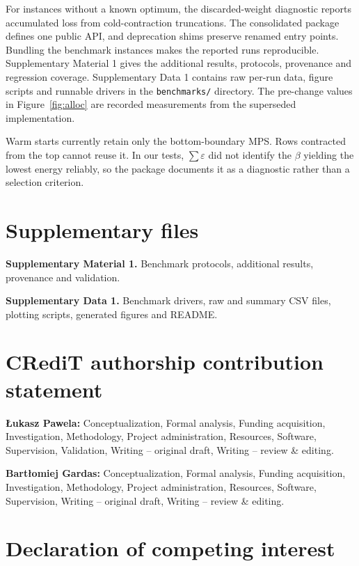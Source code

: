 \documentclass[preprint,12pt,a4paper]{elsarticle}
\begin{document}
For instances without a known optimum, the discarded-weight diagnostic reports
accumulated loss from cold-contraction truncations. The consolidated
package defines one public API, and deprecation shims preserve renamed entry
points. Bundling the benchmark instances makes the reported runs reproducible.
Supplementary Material 1 gives the additional results, protocols, provenance
and regression coverage. Supplementary Data 1 contains raw per-run data, figure
scripts and runnable drivers in the \texttt{benchmarks/} directory. The
pre-change values in Figure~\ref{fig:alloc} are recorded measurements from the
superseded implementation.

Warm starts currently retain only the bottom-boundary MPS. Rows contracted from
the top cannot reuse it. In our tests, $\sum\varepsilon$ did not identify the
$\beta$ yielding the lowest energy reliably, so the package documents it as a
diagnostic rather than a selection criterion.


\FloatBarrier

\section*{Supplementary files}

\noindent\textbf{Supplementary Material 1.} Benchmark protocols, additional
results, provenance and validation.

\noindent\textbf{Supplementary Data 1.} Benchmark drivers, raw and summary CSV
files, plotting scripts, generated figures and README.

\section*{CRediT authorship contribution statement}

\noindent\textbf{{\L}ukasz Pawela:} Conceptualization, Formal analysis, Funding
acquisition, Investigation, Methodology, Project administration, Resources,
Software, Supervision, Validation, Writing -- original draft, Writing -- review
\& editing.

\noindent\textbf{Bart\l{}omiej Gardas:} Conceptualization, Formal analysis,
Funding acquisition, Investigation, Methodology, Project administration,
Resources, Software, Supervision, Writing -- original draft, Writing -- review
\& editing.

\section*{Declaration of competing interest}
\end{document}
